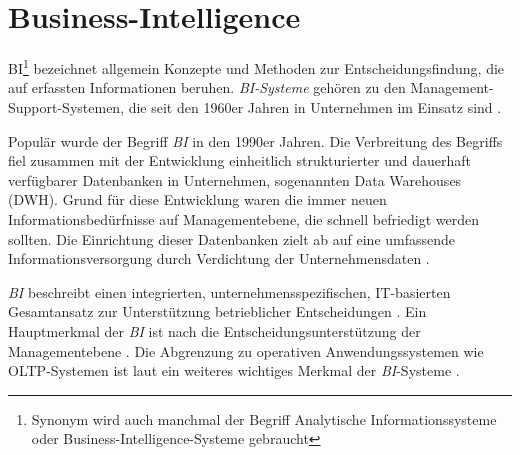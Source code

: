 

\section{Business-Intelligence}
\label{chap:two_three}
\acrfull{BI}\footnote{Synonym wird auch manchmal der Begriff Analytische Informationssysteme oder Business-Intelligence-Systeme gebraucht}
bezeichnet allgemein Konzepte und Methoden zur Entscheidungsfindung, die auf erfassten Informationen beruhen. 
\textit{\acrlong{BI}-Systeme} gehören zu den Management-Support-Systemen, die seit den 1960er Jahren in Unternehmen im Einsatz sind \cite[vgl.][83]{gronwald_integrierte_2020}.

Populär wurde der Begriff \textit{\acrshort{BI}} in den 1990er Jahren. Die Verbreitung des Begriffs fiel zusammen mit der 
Entwicklung einheitlich strukturierter und dauerhaft verfügbarer Datenbanken in Unternehmen, sogenannten Data Warehouses (DWH). 
Grund für diese Entwicklung waren die immer neuen Informationsbedürfnisse auf Managementebene, die schnell befriedigt werden sollten.
Die Einrichtung dieser Datenbanken zielt ab auf eine umfassende Informationsversorgung durch Verdichtung der Unternehmensdaten 
\cite[vgl.][268 ff.]{abts_grundkurs_2017}. 

\textit{\acrshort{BI}} beschreibt einen integrierten, unternehmensspezifischen,
IT-basierten Gesamtansatz zur Unterstützung betrieblicher Entscheidungen \cite[vgl.][270]{abts_grundkurs_2017}. 
Ein Hauptmerkmal der \textit{\acrshort{BI}} ist nach  die Entscheidungsunterstützung der Managementebene
\cite[vgl.][111]{linden_geschaftsmodellbasierte_2016}. Die Abgrenzung zu operativen
Anwendungssystemen wie \acrfull{OLTP}-Systemen ist laut \citeauthor{abts_grundkurs_2017} ein weiteres wichtiges Merkmal der \textit{\acrshort{BI}}-Systeme \cite[vgl.][267]{abts_grundkurs_2017}. 

